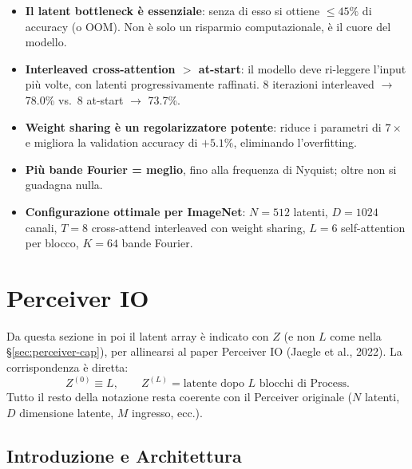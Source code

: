 \documentclass[
  11pt,
]{article}
\begin{document}
\begin{notabox}[title={\textbf{Lezioni dagli ablation studies (sintesi)}}]
\begin{itemize}
  \item \textbf{Il latent bottleneck è essenziale}: senza di esso si ottiene $\le 45\%$ di accuracy (o OOM). Non è solo un risparmio computazionale, è il cuore del modello.
  \item \textbf{Interleaved cross-attention $>$ at-start}: il modello deve ri-leggere l'input più volte, con latenti progressivamente raffinati. 8 iterazioni interleaved $\to$ 78.0\% vs.\ 8 at-start $\to$ 73.7\%.
  \item \textbf{Weight sharing è un regolarizzatore potente}: riduce i parametri di $7\times$ e migliora la validation accuracy di $+5.1\%$, eliminando l'overfitting.
  \item \textbf{Più bande Fourier = meglio}, fino alla frequenza di Nyquist; oltre non si guadagna nulla.
  \item \textbf{Configurazione ottimale per ImageNet}: $N=512$ latenti, $D=1024$ canali, $T=8$ cross-attend interleaved con weight sharing, $L=6$ self-attention per blocco, $K=64$ bande Fourier.
\end{itemize}
\end{notabox}

\clearpage
\section{Perceiver IO}
\label{sec:perceiver-io-sub}

\begin{notabox}[title={\textbf{Cambio di notazione: $Z$ al posto di $L$}}]
Da questa sezione in poi il latent array è indicato con $Z$ (e non $L$ come nella \S\ref{sec:perceiver-cap}), per allinearsi al paper Perceiver IO (Jaegle et al., 2022). La corrispondenza è diretta:
\[ Z^{(0)} \equiv L, \qquad Z^{(L)} = \text{latente dopo $L$ blocchi di Process}. \]
Tutto il resto della notazione resta coerente con il Perceiver originale ($N$ latenti, $D$ dimensione latente, $M$ ingresso, ecc.).
\end{notabox}

\subsection{Introduzione e Architettura}
\end{document}
